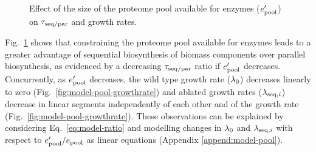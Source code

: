 \begin{figure}
  \caption{
    Effect of the size of the proteome pool available for enzymes ($e_{\mathrm{pool}}^{\prime}$) on $\tau_{\mathrm{seq}/\mathrm{par}}$ and growth rates.
  }
  \label{fig:model-pool}
\end{figure}

Fig.\ \ref{fig:model-pool} shows that constraining the proteome pool available for enzymes leads to a greater advantage of sequential biosynthesis of biomass components over parallel biosynthesis, as evidenced by a decreasing $\tau_{\mathrm{seq}/\mathrm{par}}$ ratio if $e_{\mathrm{pool}}^{\prime}$ decreases.
Concurrently, as $e_{\mathrm{pool}}^{\prime}$ decreases, the wild type growth rate ($\lambda_{0}$) decreases linearly to zero (Fig.\ \ref{fig:model-pool-growthrate}) and ablated growth rates ($\lambda_{\mathrm{seq},i}$) decrease in linear segments independently of each other and of the growth rate (Fig.\ \ref{fig:model-pool-growthrate}).
These observations can be explained by considering Eq.\ \ref{eq:model-ratio} and modelling changes in $\lambda_{0}$ and $\lambda_{\mathrm{seq},i}$ with respect to $e_{\mathrm{pool}}^{\prime}/e_{\mathrm{pool}}$ as linear equations (Appendix \ref{append:model-pool}).

